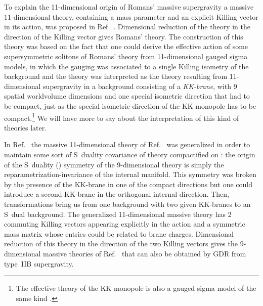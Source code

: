 \documentclass[12pt,a4paper]{article}
\begin{document}
To explain the 11-dimensional origin of Romans' massive \coordHE{}
supergravity a massive 11-dimensional theory, containing a mass
parameter and an explicit Killing vector in its action, was proposed
in Ref.~\cite{kn:BLO}.  Dimensional reduction of the theory in the
direction of the Killing vector gives Romans' theory.  The
construction of this theory was based on the fact that one could
derive the effective action of some supersymmetric solitons of Romans'
theory from 11-dimensional gauged sigma models, in which the gauging
was associated to a single Killing isometry of the background
\cite{kn:O} and the theory was interpreted as the theory resulting
from 11-dimensional supergravity in a background consisting of a {\it
  KK-brane}, with 9 spatial worldvolume dimensions and one special
isometric direction that had to be compact, just as the special
isometric direction of the KK monopole has to be compact.\footnote{The
  effective theory of the KK monopole is also a gauged sigma model of
  the same kind \cite{kn:BJO2}.}  We will have more to say about the
interpretation of this kind of theories later.

In Ref.~\cite{kn:MO} the massive 11-dimensional theory of
Ref.~\cite{kn:BLO} was generalized in order to maintain some sort of
S~duality covariance of theory compactified on \coordHE{}: the origin of
the S~duality (\coordHE{}) symmetry of the 9-dimensional
theory is simply the reparametrization-invariance of the internal
manifold. This symmetry was broken by the presence of the KK-brane in
one of the compact directions but one could introduce a second
KK-brane in the orthogonal internal direction. Then,
\coordHE{} transformations bring us from one background with
two given KK-branes to an S~dual background.  The generalized
11-dimensional massive theory has 2 commuting Killing vectors
\coordHE{}  \coordHE{} appearing explicitly
in the action and a symmetric mass matrix \coordHE{} whose entries could
be related to brane charges. Dimensional reduction of this theory in
the direction of the two Killing vectors gives the 9-dimensional
massive theories of Ref.~\cite{kn:MO} that can also be obtained by GDR
from type~IIB supergravity.
\end{document}
